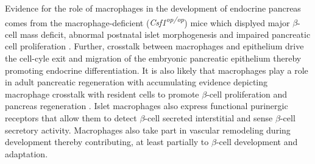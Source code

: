 \clearpage
\par Evidence for the role of macrophages in the development of endocrine pancreas comes from the macrophage-deficient (\textit{Csf1\textsuperscript{op/op}}) mice which displyed major $\beta$-cell mass deficit, abnormal postnatal islet morphogenesis and impaired pancreatic cell proliferation \textbf{\cite{}}. Further, crosstalk between macrophages and epithelium drive the cell-cyle exit and migration of the embryonic pancreatic epithelium thereby promoting endocrine differentiation. It is also likely that macrophages play a role in adult pancreatic regeneration with accumulating evidence  depicting macrophage crosstalk with resident cells to promote $\beta$-cell proliferation and pancreas regeneration \textbf{\cite{cruz_macrophages_2020}}. 
Islet macrophages also express functional purinergic receptors that allow them to detect $\beta$-cell secreted interstitial  and sense $\beta$-cell secretory activity. Macrophages also take part in vascular remodeling during development thereby contributing, at least partially to $\beta$-cell development and adaptation. 


% 


